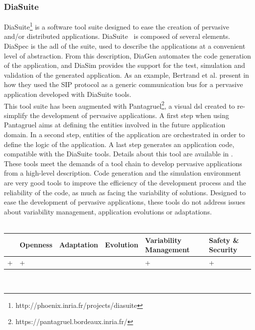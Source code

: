 \subsubsection{DiaSuite}
DiaSuite\footnote{http://phoenix.inria.fr/projects/diasuite} is a software tool suite designed to ease the creation of pervasive and/or distributed applications. DiaSuite~\cite{CASSOU:2010} is composed of several elements. DiaSpec is the \gls{adl} of the suite, used to describe the applications at a convenient level of abstraction. From this description, DiaGen automates the code generation of the application, and DiaSim provides the support for the test, simulation and validation of the generated application. As an example, Bertrand et al. present in \cite{BERTRAN:2010} how they used the SIP protocol as a generic communication bus for a pervasive application developed with DiaSuite tools.\\
This tool suite has been augmented with Pantagruel\footnote{https://pantagruel.bordeaux.inria.fr/}, a visual \gls{dsl} created to re-simplify the development of pervasive applications. A first step when using Pantagruel aims at defining the entities involved in the future application domain. In a second step, entities of the application are orchestrated in order to define the logic of the application. A last step generates an application code, compatible with the DiaSuite tools. Details about this tool are available in \cite{DREY:2009}.\\

These tools meet the demands of a tool chain to develop pervasive applications from a high-level description. Code generation and the simulation environment are very good tools to improve the efficiency of the development process and the reliability of the code, as much as facing the variability of solutions. Designed to ease the development of pervasive applications, these tools do not address issues about variability management, application evolutions or adaptations.\\
\\
\begin{tabular}{ >{\centering}m{}| >{\centering}m{} >{\centering}m{}| >{\centering}m{} >{\centering}m{}| >{\centering\arraybackslash}m{}}
{\tiny Interoperability} & {\tiny Openness} & {\tiny Adaptation} & {\tiny Evolution} & {\tiny Variability Management} & {\tiny Safety \& Security}\\
 \hline
 + & + &  &  & + & + \\ 
  \hline
\end{tabular}\\


